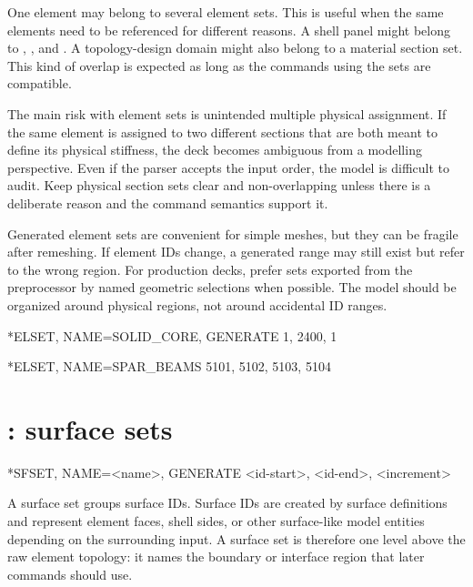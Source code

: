 One element may belong to several element sets. This is useful when the same elements need to be referenced for different reasons. A shell panel might belong to , , and . A topology-design domain might also belong to a material section set. This kind of overlap is expected as long as the commands using the sets are compatible.

The main risk with element sets is unintended multiple physical assignment. If the same element is assigned to two different sections that are both meant to define its physical stiffness, the deck becomes ambiguous from a modelling perspective. Even if the parser accepts the input order, the model is difficult to audit. Keep physical section sets clear and non-overlapping unless there is a deliberate reason and the command semantics support it.

Generated element sets are convenient for simple meshes, but they can be fragile after remeshing. If element IDs change, a generated range may still exist but refer to the wrong region. For production decks, prefer sets exported from the preprocessor by named geometric selections when possible. The model should be organized around physical regions, not around accidental ID ranges.

\begin{exampledeck}
*ELSET, NAME=SOLID_CORE, GENERATE
1, 2400, 1
\end{exampledeck}

\begin{exampledeck}
*ELSET, NAME=SPAR_BEAMS
5101, 5102, 5103, 5104
\end{exampledeck}

\clearpage

\section{: surface sets}

\begin{syntax}
*SFSET, NAME=<name>, GENERATE
<id-start>, <id-end>, <increment>
\end{syntax}

A surface set groups surface IDs. Surface IDs are created by surface definitions and represent element faces, shell sides, or other surface-like model entities depending on the surrounding input. A surface set is therefore one level above the raw element topology: it names the boundary or interface region that later commands should use.

